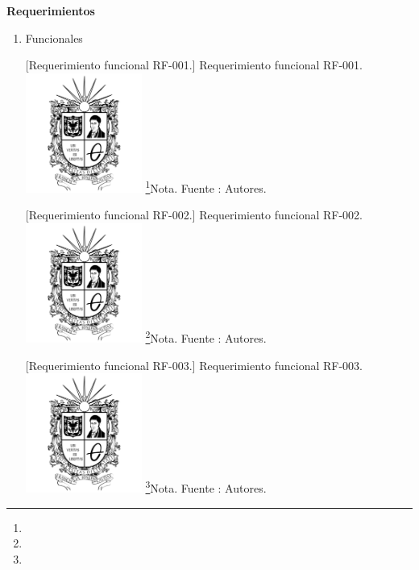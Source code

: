 {\textbf{Requerimientos}

\begin{enumerate}
    \item Funcionales
        \par\vspace{2mm}
        \begin{minipage}{0.9\textwidth}
        \centering
        [{Requerimiento funcional RF-001.}]{ Requerimiento funcional RF-001. }
        \label{req1}
        \includegraphics[width=0.3\textwidth]{Content/Images/Escudo_UD.png}
        \footnote{}{Nota. \textup{Fuente : Autores.}}
        \end{minipage}
        
        \vspace{2mm}
        \begin{minipage}{0.9\textwidth}
        \centering
        [{Requerimiento funcional RF-002.}]{ Requerimiento funcional RF-002. }
        \label{req2}
        \includegraphics[width=0.3\textwidth]{Content/Images/Escudo_UD.png}
        \footnote{}{Nota. \textup{Fuente : Autores.}}
        \end{minipage}
        
        \vspace{2mm}
        \begin{minipage}{0.9\textwidth}
        \centering
        [{Requerimiento funcional RF-003.}]{ Requerimiento funcional RF-003. }
        \label{req3}
        \includegraphics[width=0.3\textwidth]{Content/Images/Escudo_UD.png}
        \footnote{}{Nota. \textup{Fuente : Autores.}}
        \end{minipage}
        

\end{enumerate}}
